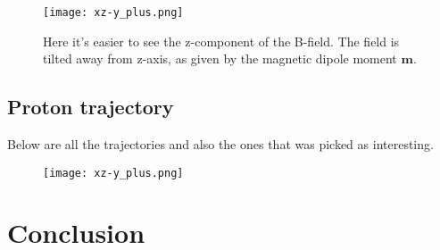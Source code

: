 \documentclass[11pt,a4paper]{article}
\begin{document}
\begin{center}
\begin{figure}[htbp] %
\label{figure.B-field}
\texttt{[image: xz-y\_plus.png]}
\caption{Here it's easier to see the z-component of the B-field. The field is tilted away from z-axis, as given by the magnetic dipole moment $\textbf{m}$.}
\end{figure}
\end{center}

\subsection{Proton trajectory}
Below are all the trajectories and also the ones that was picked as interesting.
\begin{center}
\begin{figure}[htbp] %
\label{figure.B-field}
\texttt{[image: xz-y\_plus.png]}
\caption{}
\end{figure}
\end{center}

\section{Conclusion}
\end{document}
